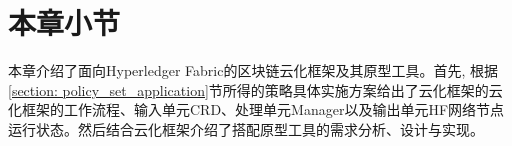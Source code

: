 \section{本章小节}

本章介绍了面向Hyperledger Fabric的区块链云化框架及其原型工具。首先, 根据\ref{section: policy_set_application}节所得的策略具体实施方案给出了云化框架的云化框架的工作流程、输入单元CRD、处理单元Manager以及输出单元HF网络节点运行状态。然后结合云化框架介绍了搭配原型工具的需求分析、设计与实现。













